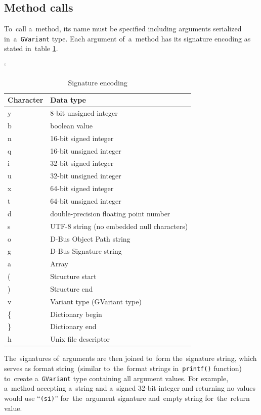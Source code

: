 \subsection{Method calls}
To~call a~method, its name must be specified including arguments serialized
in~a~\texttt{GVariant} type. Each argument of~a~method has its signature encoding
as stated in~table \ref{tab:tab1}.\\

\FloatBarrier
\begin{table}[!h]
\catcode`
\caption{Signature encoding}
\label{tab:tab1}
\begin{center}
	\begin{tabular}{| l | l |}
	\hline
	\textbf{Character} & \textbf{Data type} \\ \hline
	y & 8-bit unsigned integer \\ \hline
	b & boolean value \\ \hline
	n & 16-bit signed integer \\ \hline
	q & 16-bit unsigned integer \\ \hline
	i & 32-bit signed integer \\ \hline
	u & 32-bit unsigned integer \\ \hline
	x & 64-bit signed integer \\ \hline
	t & 64-bit unsigned integer \\ \hline
	d & double-precision floating point number \\ \hline
	s & UTF-8 string (no embedded null characters) \\ \hline
	o & D-Bus Object Path string \\ \hline
	g & D-Bus Signature string \\ \hline
	a & Array \\ \hline
	( & Structure start \\ \hline
	) & Structure end \\ \hline
	v & Variant type (GVariant type) \\ \hline
	\{ & Dictionary begin \\ \hline
	\} & Dictionary end \\ \hline
	h & Unix file descriptor \\
	\hline
	\end{tabular}
\end{center}
\end{table}
\FloatBarrier

The~signatures of~arguments are then joined to~form the~signature
string, which serves as format string~(similar to~the~format strings
in~\texttt{printf()} function) to~create a~\texttt{GVariant} type containing
all argument values. For example, a~method accepting a~string and a~signed
\mbox{32-bit} integer and returning no values would use ``\texttt{(si)}''
for~the~argument signature and~empty string for~the~return value.

